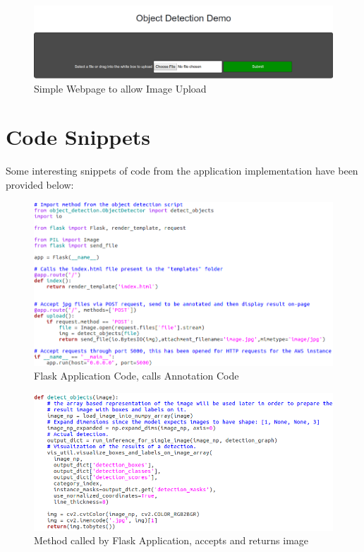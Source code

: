 \documentclass[12pt]{report}
\begin{document}
\vspace{0.5cm}
\begin{figure}[ht!]
	\centering
	\includegraphics[width=15cm]{index}
	\caption{Simple Webpage to allow Image Upload}
	\label{fig:index}
\end{figure}

\section{Code Snippets}
\begin{flushleft}
Some interesting snippets of code from the application implementation have been provided below:
\end{flushleft}

\vspace{0.5cm}
\begin{figure}[ht!]
	\centering
	\includegraphics[width=15cm]{flask}
	\caption{Flask Application Code, calls Annotation Code}
	\label{fig:flask}
\end{figure}

\vspace{0.5cm}
\begin{figure}[ht!]
	\centering
	\includegraphics[width=15cm]{flask-2}
	\caption{Method called by Flask Application, accepts and returns image}
	\label{fig:flask-2}
\end{figure}
\end{document}
